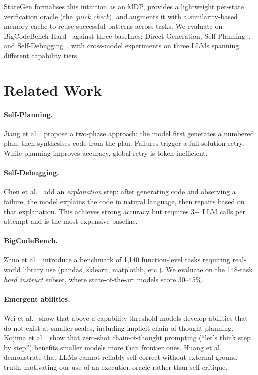 \documentclass[11pt,twocolumn]{article}
\begin{document}
StateGen formalises this intuition as an MDP, provides a lightweight per-state
verification oracle (the \emph{quick check}), and augments it with a
similarity-based memory cache to reuse successful patterns across tasks.
We evaluate on BigCodeBench Hard~\cite{zhuo2024bigcodebench} against three
baselines: Direct Generation, Self-Planning~\cite{jiang2024selfplanning}, and
Self-Debugging~\cite{chen2024selfdebugging}, with cross-model experiments on
three LLMs spanning different capability tiers.

\section{Related Work}

\paragraph{Self-Planning.}
Jiang et al.~\cite{jiang2024selfplanning} propose a two-phase approach: the
model first generates a numbered plan, then synthesises code from the plan.
Failures trigger a full solution retry. While planning improves accuracy, global
retry is token-inefficient.

\paragraph{Self-Debugging.}
Chen et al.~\cite{chen2024selfdebugging} add an \emph{explanation} step: after
generating code and observing a failure, the model explains the code in natural
language, then repairs based on that explanation. This achieves strong accuracy
but requires 3+ LLM calls per attempt and is the most expensive baseline.

\paragraph{BigCodeBench.}
Zhuo et al.~\cite{zhuo2024bigcodebench} introduce a benchmark of 1,140
function-level tasks requiring real-world library use (pandas, sklearn,
matplotlib, etc.). We evaluate on the 148-task \emph{hard instruct} subset,
where state-of-the-art models score 30--45\%.

\paragraph{Emergent abilities.}
Wei et al.~\cite{wei2022emergent} show that above a capability threshold models
develop abilities that do not exist at smaller scales, including implicit
chain-of-thought planning. Kojima et al.~\cite{kojima2022zeroshot} show that
zero-shot chain-of-thought prompting (``let's think step by step'') benefits
smaller models more than frontier ones.
Huang et al.~\cite{huang2023selfcorrect} demonstrate that LLMs cannot reliably
self-correct without external ground truth, motivating our use of an execution
oracle rather than self-critique.
\end{document}
